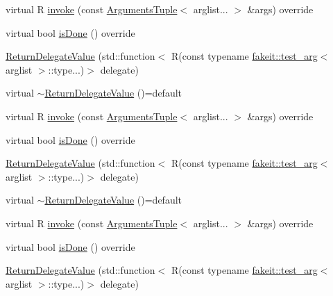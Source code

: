 \begin{DoxyCompactItemize}
\item 
virtual R \mbox{\hyperlink{structfakeit_1_1ReturnDelegateValue_a6f3758c13895d1fc748357f94983404a}{invoke}} (const \mbox{\hyperlink{namespacefakeit_a476a37a598825e1b5dd67b3a176491a1}{Arguments\+Tuple}}$<$ arglist... $>$ \&args) override
\item 
virtual bool \mbox{\hyperlink{structfakeit_1_1ReturnDelegateValue_ac6c33b7d5fff3fedeec91a4780924b84}{is\+Done}} () override
\item 
\mbox{\hyperlink{structfakeit_1_1ReturnDelegateValue_a889666c123cb4e75bee7771b9d9433a5}{Return\+Delegate\+Value}} (std\+::function$<$ R(const typename \mbox{\hyperlink{structfakeit_1_1test__arg}{fakeit\+::test\+\_\+arg}}$<$ arglist $>$\+::type...)$>$ delegate)
\item 
virtual \mbox{\hyperlink{structfakeit_1_1ReturnDelegateValue_aa99d3b17fdae68f84cbc38c0acaee3c7}{$\sim$\+Return\+Delegate\+Value}} ()=default
\item 
virtual R \mbox{\hyperlink{structfakeit_1_1ReturnDelegateValue_a6f3758c13895d1fc748357f94983404a}{invoke}} (const \mbox{\hyperlink{namespacefakeit_a476a37a598825e1b5dd67b3a176491a1}{Arguments\+Tuple}}$<$ arglist... $>$ \&args) override
\item 
virtual bool \mbox{\hyperlink{structfakeit_1_1ReturnDelegateValue_ac6c33b7d5fff3fedeec91a4780924b84}{is\+Done}} () override
\item 
\mbox{\hyperlink{structfakeit_1_1ReturnDelegateValue_a889666c123cb4e75bee7771b9d9433a5}{Return\+Delegate\+Value}} (std\+::function$<$ R(const typename \mbox{\hyperlink{structfakeit_1_1test__arg}{fakeit\+::test\+\_\+arg}}$<$ arglist $>$\+::type...)$>$ delegate)
\item 
virtual \mbox{\hyperlink{structfakeit_1_1ReturnDelegateValue_aa99d3b17fdae68f84cbc38c0acaee3c7}{$\sim$\+Return\+Delegate\+Value}} ()=default
\item 
virtual R \mbox{\hyperlink{structfakeit_1_1ReturnDelegateValue_a6f3758c13895d1fc748357f94983404a}{invoke}} (const \mbox{\hyperlink{namespacefakeit_a476a37a598825e1b5dd67b3a176491a1}{Arguments\+Tuple}}$<$ arglist... $>$ \&args) override
\item 
virtual bool \mbox{\hyperlink{structfakeit_1_1ReturnDelegateValue_ac6c33b7d5fff3fedeec91a4780924b84}{is\+Done}} () override
\item 
\mbox{\hyperlink{structfakeit_1_1ReturnDelegateValue_a889666c123cb4e75bee7771b9d9433a5}{Return\+Delegate\+Value}} (std\+::function$<$ R(const typename \mbox{\hyperlink{structfakeit_1_1test__arg}{fakeit\+::test\+\_\+arg}}$<$ arglist $>$\+::type...)$>$ delegate)

\end{DoxyCompactItemize}
